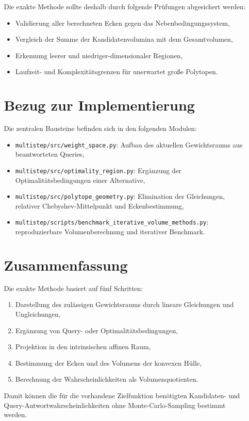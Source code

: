 \documentclass[11pt,a4paper]{article}
\begin{document}
Die exakte Methode sollte deshalb durch folgende Prüfungen abgesichert werden:
\begin{itemize}
  \item Validierung aller berechneten Ecken gegen das Nebenbedingungssystem,
  \item Vergleich der Summe der Kandidatenvolumina mit dem Gesamtvolumen,
  \item Erkennung leerer und niedriger-dimensionaler Regionen,
  \item Laufzeit- und Komplexitätsgrenzen für unerwartet große Polytopen.
\end{itemize}

\section{Bezug zur Implementierung}

Die zentralen Bausteine befinden sich in den folgenden Modulen:
\begin{itemize}
  \item \texttt{multistep/src/weight\_space.py}: Aufbau des aktuellen
        Gewichtsraums aus beantworteten Queries,
  \item \texttt{multistep/src/optimality\_region.py}: Ergänzung der
        Optimalitätsbedingungen einer Alternative,
  \item \texttt{multistep/src/polytope\_geometry.py}: Elimination der
        Gleichungen, relativer Chebyshev-Mittelpunkt und Eckenbestimmung,
  \item \texttt{multistep/scripts/benchmark\_iterative\_volume\_methods.py}:
        reproduzierbare Volumenberechnung und iterativer Benchmark.
\end{itemize}

\section{Zusammenfassung}

Die exakte Methode basiert auf fünf Schritten:
\begin{enumerate}
  \item Darstellung des zulässigen Gewichtsraums durch lineare Gleichungen und
        Ungleichungen,
  \item Ergänzung von Query- oder Optimalitätsbedingungen,
  \item Projektion in den intrinsischen affinen Raum,
  \item Bestimmung der Ecken und des Volumens der konvexen Hülle,
  \item Berechnung der Wahrscheinlichkeiten als Volumenquotienten.
\end{enumerate}

Damit können die für die vorhandene Zielfunktion benötigten
Kandidaten- und Query-Antwortwahrscheinlichkeiten ohne Monte-Carlo-Sampling
bestimmt werden.
\end{document}

